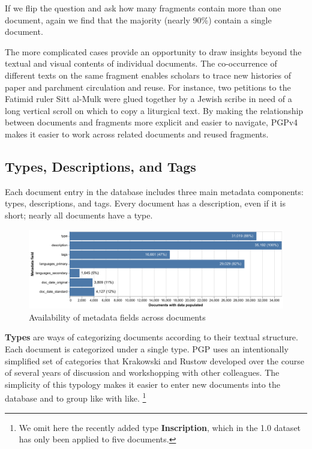 \documentclass{article}
\begin{document}

If we flip the question and ask how many fragments contain more than one document, again we find that the majority (nearly 90\%) contain a single document.

The more complicated cases provide an opportunity to draw insights beyond the textual and visual contents of individual documents. The co-occurrence of different texts on the same fragment enables scholars to trace new histories of paper and parchment circulation and reuse. For instance, two petitions to the Fatimid ruler Sitt al-Mulk \autocite{noauthor_state_1024, noauthor_state_1021} were glued together by a Jewish scribe in need of a long vertical scroll on which to copy a liturgical text. By making the relationship between documents and fragments more explicit and easier to navigate, PGPv4 makes it easier to work across related documents and reused fragments.

\subsection{Types, Descriptions, and Tags}

Each document entry in the database includes three main metadata components: types, descriptions, and tags. Every document has a description, even if it is short; nearly all documents have a type.

\begin{figure}[!hbt]
    \centering
    \includegraphics[width=1.0\linewidth]{charts/metadata_available.pdf}
    \caption{Availability of metadata fields across documents}
    \label{fig:metadata-status}
\end{figure}

\textbf{Types} are ways of categorizing documents according to their textual structure. Each document is categorized under a single type. PGP uses an intentionally simplified set of categories that Krakowski and Rustow developed over the course of several years of discussion and workshopping with other colleagues. The simplicity of this typology makes it easier to enter new documents into the database and to group like with like. \footnote{We omit here the recently added type \textbf{Inscription}, which in the 1.0 dataset has only been applied to five documents.}
\end{document}
